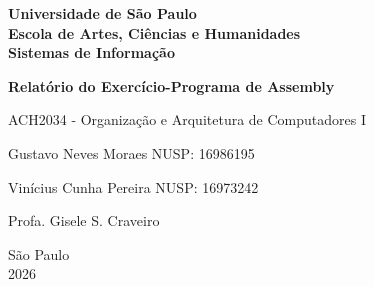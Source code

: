 \begin{titlepage}
    \begin{center}

        \textbf{\Large
        Universidade de São Paulo\\
        Escola de Artes, Ciências e Humanidades\\
        Sistemas de Informação
        }

        \vspace{3cm}

        {\LARGE
        \textbf{Relatório do Exercício-Programa de Assembly}
        }

        \vspace{0.5cm}

        {\Large
        ACH2034 - Organização e Arquitetura de Computadores I
        }

        \vfill

        \begin{flushleft}

            Gustavo Neves Moraes \hfill NUSP: 16986195

            Vinícius Cunha Pereira \hfill NUSP: 16973242
        \end{flushleft}

        \vspace{2cm}

        Profa. Gisele S. Craveiro

        \vfill

        São Paulo\\
        2026

    \end{center}
\end{titlepage}
